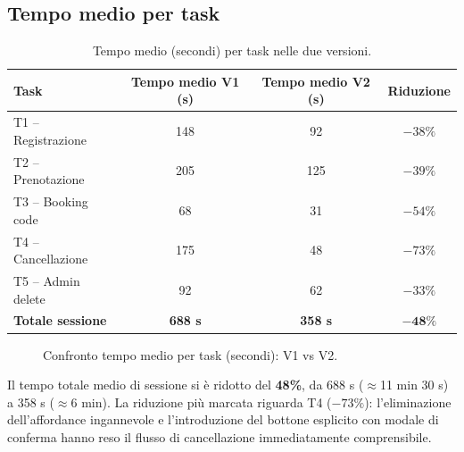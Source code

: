 \subsection{Tempo medio per task}

\begin{table}[H]
\centering
\renewcommand{\arraystretch}{1.4}
\small
\begin{tabular}{|l|c|c|c|}
\hline
\textbf{Task} & \textbf{Tempo medio V1 (s)} & \textbf{Tempo medio V2 (s)} & \textbf{Riduzione} \\
\hline
T1 -- Registrazione  & 148 &  92 & $-38\%$ \\ \hline
T2 -- Prenotazione   & 205 & 125 & $-39\%$ \\ \hline
T3 -- Booking code   &  68 &  31 & $-54\%$ \\ \hline
T4 -- Cancellazione  & 175 &  48 & $-73\%$ \\ \hline
T5 -- Admin delete   &  92 &  62 & $-33\%$ \\ \hline
\hline
\textbf{Totale sessione} & \textbf{688 s} & \textbf{358 s} & $\mathbf{-48\%}$ \\ \hline
\end{tabular}
\caption{Tempo medio (secondi) per task nelle due versioni.}
\label{tab:tempi}
\end{table}

\ifshowimages
\begin{figure}[H]
\centering
{}
\caption{Confronto tempo medio per task (secondi): V1 vs V2.}
\label{fig:tempi_chart}
\end{figure}
\fi

Il tempo totale medio di sessione si è ridotto del \textbf{48\%}, da 688 s ($\approx$11 min 30 s) a 358 s ($\approx$6 min). La riduzione più marcata riguarda T4 ($-73\%$): l'eliminazione dell'affordance ingannevole e l'introduzione del bottone esplicito con modale di conferma hanno reso il flusso di cancellazione immediatamente comprensibile.

